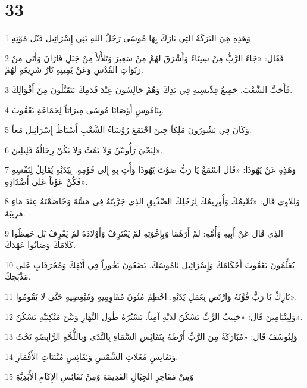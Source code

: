\chapter{33}

\par 1 وَهَذِهِ هِيَ البَرَكَةُ التِي بَارَكَ بِهَا مُوسَى رَجُلُ اللهِ بَنِي إِسْرَائِيل قَبْل مَوْتِهِ
\par 2 فَقَال: «جَاءَ الرَّبُّ مِنْ سِينَاءَ وَأَشْرَقَ لهُمْ مِنْ سَعِيرَ وَتَلأْلأَ مِنْ جَبَلِ فَارَانَ وَأَتَى مِنْ رَبَوَاتِ القُدْسِ وَعَنْ يَمِينِهِ نَارُ شَرِيعَةٍ لهُمْ.
\par 3 فَأَحَبَّ الشَّعْبَ. جَمِيعُ قِدِّيسِيهِ فِي يَدِكَ وَهُمْ جَالِسُونَ عِنْدَ قَدَمِكَ يَتَقَبَّلُونَ مِنْ أَقْوَالِكَ.
\par 4 بِنَامُوسٍ أَوْصَانَا مُوسَى مِيرَاثاً لِجَمَاعَةِ يَعْقُوبَ.
\par 5 وَكَانَ فِي يَشُورُونَ مَلِكاً حِينَ اجْتَمَعَ رُؤَسَاءُ الشَّعْبِ أَسْبَاطُ إِسْرَائِيل مَعاً.
\par 6 لِيَحْيَ رَأُوبَيْنُ وَلا يَمُتْ وَلا يَكُنْ رِجَالُهُ قَلِيلِينَ».
\par 7 وَهَذِهِ عَنْ يَهُوذَا: «قَال اسْمَعْ يَا رَبُّ صَوْتَ يَهُوذَا وَأْتِ بِهِ إِلى قَوْمِهِ. بِيَدَيْهِ يُقَاتِلُ لِنَفْسِهِ فَكُنْ عَوْناً عَلى أَضْدَادِهِ».
\par 8 وَلِلاوِي قَال: «تُمِّيمُكَ وَأُورِيمُكَ لِرَجُلِكَ الصِّدِّيقِ الذِي جَرَّبْتَهُ فِي مَسَّةَ وَخَاصَمْتَهُ عِنْدَ مَاءِ مَرِيبَةَ.
\par 9 الذِي قَال عَنْ أَبِيهِ وَأُمِّهِ: لمْ أَرَهُمَا وَبِإِخْوَتِهِ لمْ يَعْتَرِفْ وَأَوْلادَهُ لمْ يَعْرِفْ بَل حَفِظُوا كَلامَكَ وَصَانُوا عَهْدَكَ.
\par 10 يُعَلِّمُونَ يَعْقُوبَ أَحْكَامَكَ وَإِسْرَائِيل نَامُوسَكَ. يَضَعُونَ بَخُوراً فِي أَنْفِكَ وَمُحْرَقَاتٍ عَلى مَذْبَحِكَ.
\par 11 بَارِكْ يَا رَبُّ قُوَّتَهُ وَارْتَضِ بِعَمَلِ يَدَيْهِ. احْطِمْ مُتُونَ مُقَاوِمِيهِ وَمُبْغِضِيهِ حَتَّى لا يَقُومُوا».
\par 12 وَلِبِنْيَامِينَ قَال: «حَبِيبُ الرَّبِّ يَسْكُنُ لدَيْهِ آمِناً. يَسْتُرُهُ طُول النَّهَارِ وَبَيْنَ مَنْكِبَيْهِ يَسْكُنُ».
\par 13 وَلِيُوسُفَ قَال: «مُبَارَكَةٌ مِنَ الرَّبِّ أَرْضُهُ بِنَفَائِسِ السَّمَاءِ بِالنَّدَى وَبِاللُّجَّةِ الرَّابِضَةِ تَحْتُ
\par 14 وَنَفَائِسِ مُغَلاتِ الشَّمْسِ وَنَفَائِسِ مُنْبَتَاتِ الأَقْمَارِ.
\par 15 وَمِنْ مَفَاخِرِ الجِبَالِ القَدِيمَةِ وَمِنْ نَفَائِسِ الإِكَامِ الأَبَدِيَّةِ
